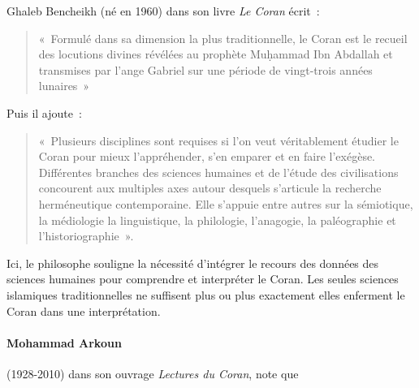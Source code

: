 Ghaleb Bencheikh (né en 1960) dans son livre \emph{Le Coran} écrit~:
\begin{quote}
    

«~Formulé dans sa dimension la plus traditionnelle, le Coran est le
recueil des locutions divines révélées au prophète Muḥammad Ibn Abdallah
et transmises par l'ange Gabriel sur une période de vingt-trois années
lunaires~»
\end{quote}
Puis il ajoute~:
\begin{quote}
«~Plusieurs disciplines sont requises si l'on veut véritablement étudier
le Coran pour mieux l'appréhender, s'en emparer et en faire l'exégèse.
Différentes branches des sciences humaines et de l'étude des
civilisations concourent aux multiples axes autour desquels s'articule
la recherche herméneutique contemporaine. Elle s'appuie entre autres sur
la sémiotique, la médiologie la linguistique, la philologie, l'anagogie,
la paléographie et l'historiographie~».
\end{quote}
Ici, le philosophe souligne la nécessité d'intégrer le recours des
données des sciences humaines pour comprendre et interpréter le Coran.
Les seules sciences islamiques traditionnelles ne suffisent plus ou plus
exactement elles enferment le Coran dans une interprétation.

\paragraph{Mohammad Arkoun} \label{Theol:Arkoun4} (1928-2010) dans son ouvrage \emph{Lectures du
Coran}, note que

